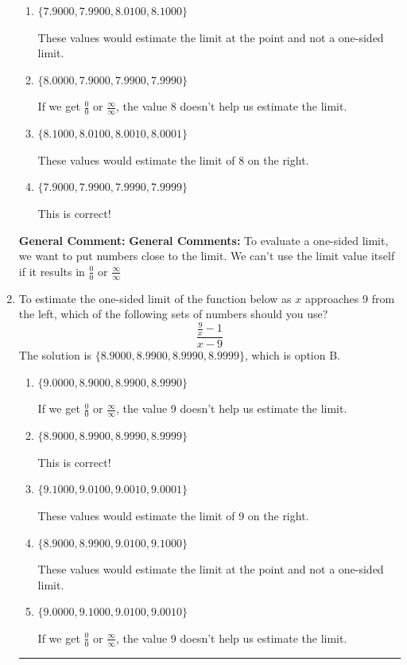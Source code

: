\documentclass{extbook}[14pt]
\newcommand{\litem}[1]{\item #1

\rule{\textwidth}{0.4pt}}
\begin{document}
\begin{enumerate}
{\begin{enumerate}[label=\Alph*.]
If we get $\frac{0}{0}$ or $\frac{\infty}{\infty}$, the value 8 doesn't help us estimate the limit.
\item \( \{ 7.9000, 7.9900, 8.0100, 8.1000 \} \)

These values would estimate the limit at the point and not a one-sided limit.
\item \( \{ 8.0000, 7.9000, 7.9900, 7.9990 \} \)

If we get $\frac{0}{0}$ or $\frac{\infty}{\infty}$, the value 8 doesn't help us estimate the limit.
\item \( \{ 8.1000, 8.0100, 8.0010, 8.0001 \} \)

These values would estimate the limit of 8 on the right.
\item \( \{ 7.9000, 7.9900, 7.9990, 7.9999 \} \)

This is correct!
\end{enumerate}

\textbf{General Comment:} \textbf{General Comments:} To evaluate a one-sided limit, we want to put numbers close to the limit. We can't use the limit value itself if it results in $\frac{0}{0}$ or $\frac{\infty}{\infty}$
}
\litem{
To estimate the one-sided limit of the function below as $x$ approaches 9 from the left, which of the following sets of numbers should you use?
\[ \frac{\frac{9}{x} - 1}{x - 9} \]The solution is \( \{ 8.9000, 8.9900, 8.9990, 8.9999 \} \), which is option B.\begin{enumerate}[label=\Alph*.]
\item \( \{ 9.0000, 8.9000, 8.9900, 8.9990 \} \)

If we get $\frac{0}{0}$ or $\frac{\infty}{\infty}$, the value 9 doesn't help us estimate the limit.
\item \( \{ 8.9000, 8.9900, 8.9990, 8.9999 \} \)

This is correct!
\item \( \{ 9.1000, 9.0100, 9.0010, 9.0001 \} \)

These values would estimate the limit of 9 on the right.
\item \( \{ 8.9000, 8.9900, 9.0100, 9.1000 \} \)

These values would estimate the limit at the point and not a one-sided limit.
\item \( \{ 9.0000, 9.1000, 9.0100, 9.0010 \} \)

If we get $\frac{0}{0}$ or $\frac{\infty}{\infty}$, the value 9 doesn't help us estimate the limit.
\end{enumerate}

}
\end{enumerate}
\end{document}
